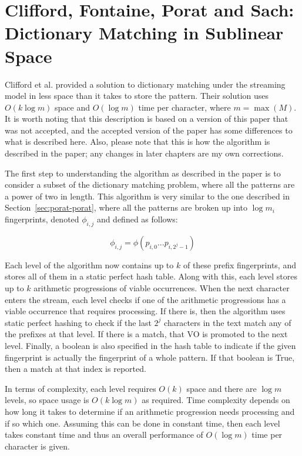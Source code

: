 \documentclass[ %
                    author={Dominic Joseph Moylett},
                    degree={MEng},
                     title={Dictionary Matching with Fingerprints},
                  subtitle={An Empirical Analysis},
                      type={research},
                      year={2015} ]{dissertation}
\begin{document}
\section{Clifford, Fontaine, Porat and Sach: Dictionary Matching in Sublinear Space}
\label{sec:theory-clifford}

Clifford et al.\cite{2015arXiv150406242C} provided a solution to dictionary matching under the streaming model in less space than it takes to store the pattern. Their solution uses $O(k\log m)$ space and $O(\log m)$ time per character, where $m = \max(M)$. It is worth noting that this description is based on a version of this paper that was not accepted, and the accepted version of the paper has some differences to what is described here. Also, please note that this is how the algorithm is described in the paper; any changes in later chapters are my own corrections.

The first step to understanding the algorithm as described in the paper is to consider a subset of the dictionary matching problem, where all the patterns are a power of two in length. This algorithm is very similar to the one described in Section~\ref{sec:porat-porat}, where all the patterns are broken up into $\log m_i$ fingerprints, denoted $\phi_{i,j}$ and defined as follows:

$$\phi_{i,j} = \phi(p_{i,0}...p_{i,2^j-1})$$

Each level of the algorithm now contains up to $k$ of these prefix fingerprints, and stores all of them in a static perfect hash table. Along with this, each level stores up to $k$ arithmetic progressions of viable occurrences. When the next character enters the stream, each level checks if one of the arithmetic progressions has a viable occurrence that requires processing. If there is, then the algorithm uses static perfect hashing to check if the last $2^j$ characters in the text match any of the prefixes at that level. If there is a match, that VO is promoted to the next level. Finally, a boolean is also specified in the hash table to indicate if the given fingerprint is actually the fingerprint of a whole pattern. If that boolean is True, then a match at that index is reported.

In terms of complexity, each level requires $O(k)$ space and there are $\log m$ levels, so space usage is $O(k\log m)$ as required. Time complexity depends on how long it takes to determine if an arithmetic progression needs processing and if so which one. Assuming this can be done in constant time, then each level takes constant time and thus an overall performance of $O(\log m)$ time per character is given.
\end{document}
